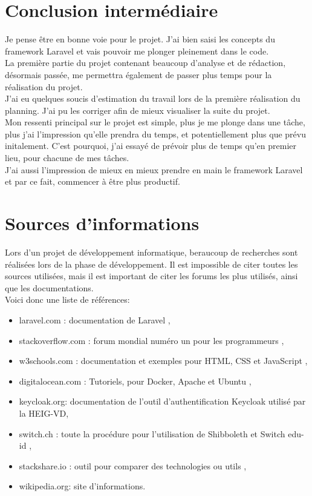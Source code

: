 \documentclass[
    iai, %
    il, %
]{heig-tb}
\begin{document}

\section{Conclusion intermédiaire}
Je pense être en bonne voie pour le projet. J'ai bien saisi les concepts du framework Laravel et
vais pouvoir me plonger pleinement dans le code.\\
La première partie du projet contenant beaucoup d'analyse et de rédaction, désormais
passée, me permettra également de passer plus temps pour la réalisation du projet.\\
J'ai eu quelques soucis d'estimation du travail lors de la première réalisation du planning. J'ai pu
les corriger afin de mieux visualiser la suite du projet.\\
Mon ressenti principal sur le projet est simple, plus je me plonge dans une tâche, plus j'ai
l'impression qu'elle prendra du temps, et potentiellement plus que prévu initalement. C'est
pourquoi, j'ai essayé de prévoir plus de temps qu'en premier lieu, pour chacune de mes tâches.\\
J'ai aussi l'impression de mieux en mieux prendre en main le framework Laravel et par ce fait,
commencer à être plus productif.\\

\section{Sources d'informations}
Lors d'un projet de développement informatique, beraucoup de recherches sont réalisées lors de la
phase de développement. Il est impossible de citer toutes les sources utilisées, mais il est
important de citer les forums les plus utilisés, ainsi que les documentations.\\
Voici donc une liste de références:

\begin{itemize}
    \item laravel.com : documentation de Laravel \cite{laravel},
    \item stackoverflow.com : forum mondial numéro un pour les programmeurs \cite{stackoverflow},
    \item w3schools.com : documentation et exemples pour HTML, CSS et JavaScript \cite{w3schools},
    \item digitalocean.com : Tutoriels, pour Docker, Apache et Ubuntu \cite{digitalocean},
    \item keycloak.org: documentation de l'outil d'authentification Keycloak utilisé par la HEIG-VD,
    \item switch.ch : toute la procédure pour l’utilisation de Shibboleth et Switch edu-id \cite{switch},
    \item stackshare.io : outil pour comparer des technologies ou utils \cite{stackshare},
    \item wikipedia.org: site d'informations.
\end{itemize}
\end{document}
